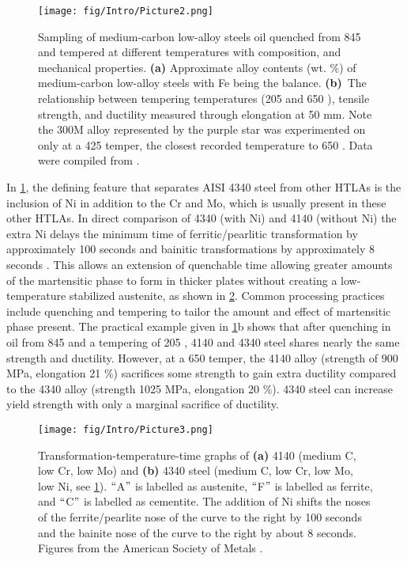 	\begin{figure}
		\centering
		\texttt{[image: fig/Intro/Picture2.png]}
		\caption[Sampling of medium-carbon low-alloy steels oil quenched from 845 \celsius{} and tempered at different temperatures with composition, and mechanical properties.]{Sampling of medium-carbon low-alloy steels oil quenched from 845 \celsius{} and tempered at different temperatures with composition, and mechanical properties. \textbf{(a)} Approximate alloy contents (wt. $\%$) of medium-carbon low-alloy steels with Fe being the balance. \textbf{(b)}\ The relationship between tempering temperatures (205 \celsius{} and 650 \celsius{}), tensile strength, and ductility measured through elongation at 50 mm. Note the 300M alloy represented by the purple star was experimented on only at a 425 \celsius{} temper, the closest recorded temperature to 650 \celsius{}. Data were compiled from \cite{RN2268}.}
		\label{fig:Intro2}
	\end{figure}

	
	
	
	In \ref{fig:Intro2}, the defining feature that separates AISI 4340 steel from other HTLAs is the inclusion of Ni in addition to the Cr and Mo, which is usually present in these other HTLAs. In direct comparison of 4340 (with Ni) and 4140 (without Ni) the extra Ni delays the minimum time of ferritic/pearlitic transformation by approximately 100 seconds and bainitic transformations by approximately 8 seconds \cite{RN2269}. This allows an extension of quenchable time allowing greater amounts of the martensitic phase to form in thicker plates without creating a low-temperature stabilized austenite, as shown in \ref{fig:Intro3}. Common processing practices include quenching and tempering to tailor the amount and effect of martensitic phase present. The practical example given in \ref{fig:Intro2}b shows that after quenching in oil from 845 \celsius{} and a tempering of 205 \celsius{}, 4140 and 4340 steel shares nearly the same strength and ductility. However, at a 650 \celsius{} temper, the 4140 alloy (strength of 900 MPa, elongation 21 $\%$) sacrifices some strength to gain extra ductility compared to the 4340 alloy (strength 1025 MPa, elongation 20 $\%$).\textbf{ }4340 steel can increase yield strength with only a marginal sacrifice of ductility.
	
	
	\begin{figure}
		\centering
		\texttt{[image: fig/Intro/Picture3.png]}
		\caption[Transformation-temperature-time graphs of \textbf{(a)} 4140 (medium C, low Cr, low Mo) and \textbf{(b)} 4340 steel (medium C, low Cr, low Mo, low Ni, see \ref{fig:Intro2}).]{Transformation-temperature-time graphs of \textbf{(a)} 4140 (medium C, low Cr, low Mo) and \textbf{(b)} 4340 steel (medium C, low Cr, low Mo, low Ni, see \ref{fig:Intro2}). $``$A$"$  is labelled as austenite, $``$F$"$  is labelled as ferrite, and $``$C$"$  is labelled as cementite. The addition of Ni shifts the noses of the ferrite/pearlite nose of the curve to the right by 100 seconds and the bainite nose of the curve to the right by about 8 seconds. Figures from the American Society of Metals \cite{RN2269}.}
		\label{fig:Intro3}
	\end{figure}

